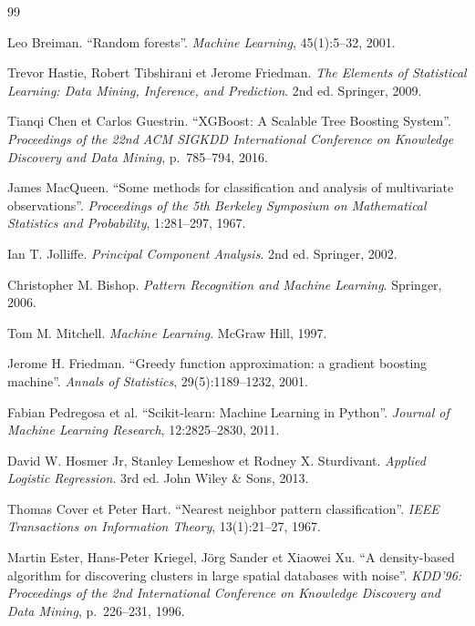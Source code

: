 \documentclass[11pt,a4paper,twoside]{report}
\begin{document}
\begin{thebibliography}{99}

Leo Breiman. ``Random forests''.
\textit{Machine Learning}, 45(1):5--32, 2001.

Trevor Hastie, Robert Tibshirani et Jerome Friedman.
\textit{The Elements of Statistical Learning: Data Mining, Inference, and Prediction}. 2nd ed. Springer, 2009.

Tianqi Chen et Carlos Guestrin. ``XGBoost: A Scalable Tree Boosting System''.
\textit{Proceedings of the 22nd ACM SIGKDD International Conference on Knowledge Discovery and Data Mining}, p.~785--794, 2016.

James MacQueen. ``Some methods for classification and analysis of multivariate observations''.
\textit{Proceedings of the 5th Berkeley Symposium on Mathematical Statistics and Probability}, 1:281--297, 1967.

Ian T. Jolliffe.
\textit{Principal Component Analysis}. 2nd ed. Springer, 2002.

Christopher M. Bishop.
\textit{Pattern Recognition and Machine Learning}. Springer, 2006.

Tom M. Mitchell.
\textit{Machine Learning}. McGraw Hill, 1997.

Jerome H. Friedman. ``Greedy function approximation: a gradient boosting machine''.
\textit{Annals of Statistics}, 29(5):1189--1232, 2001.

Fabian Pedregosa et al. ``Scikit-learn: Machine Learning in Python''.
\textit{Journal of Machine Learning Research}, 12:2825--2830, 2011.

David W. Hosmer Jr, Stanley Lemeshow et Rodney X. Sturdivant.
\textit{Applied Logistic Regression}. 3rd ed. John Wiley \& Sons, 2013.

Thomas Cover et Peter Hart. ``Nearest neighbor pattern classification''.
\textit{IEEE Transactions on Information Theory}, 13(1):21--27, 1967.

Martin Ester, Hans-Peter Kriegel, Jörg Sander et Xiaowei Xu. ``A density-based algorithm for discovering clusters in large spatial databases with noise''.
\textit{KDD'96: Proceedings of the 2nd International Conference on Knowledge Discovery and Data Mining}, p.~226--231, 1996.


\end{thebibliography}
\end{document}
